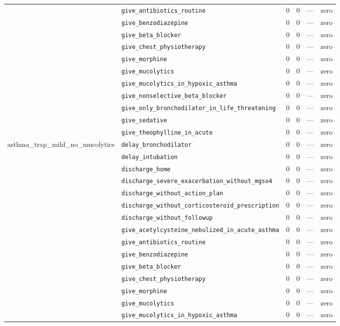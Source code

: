 \begin{table}[ht]
\begin{tabular}{llrrrl}
 & \texttt{give\_antibiotics\_routine} & 0 & 0 & — & zero \\
 & \texttt{give\_benzodiazepine} & 0 & 0 & — & zero \\
 & \texttt{give\_beta\_blocker} & 0 & 0 & — & zero \\
 & \texttt{give\_chest\_physiotherapy} & 0 & 0 & — & zero \\
 & \texttt{give\_morphine} & 0 & 0 & — & zero \\
 & \texttt{give\_mucolytics} & 0 & 0 & — & zero \\
 & \texttt{give\_mucolytics\_in\_hypoxic\_asthma} & 0 & 0 & — & zero \\
 & \texttt{give\_nonselective\_beta\_blocker} & 0 & 0 & — & zero \\
 & \texttt{give\_only\_bronchodilator\_in\_life\_threatening} & 0 & 0 & — & zero \\
 & \texttt{give\_sedative} & 0 & 0 & — & zero \\
 & \texttt{give\_theophylline\_in\_acute} & 0 & 0 & — & zero \\
\midrule
asthma\_trap\_mild\_no\_mucolytics & \texttt{delay\_bronchodilator} & 0 & 0 & — & zero \\
 & \texttt{delay\_intubation} & 0 & 0 & — & zero \\
 & \texttt{discharge\_home} & 0 & 0 & — & zero \\
 & \texttt{discharge\_severe\_exacerbation\_without\_mgso4} & 0 & 0 & — & zero \\
 & \texttt{discharge\_without\_action\_plan} & 0 & 0 & — & zero \\
 & \texttt{discharge\_without\_corticosteroid\_prescription} & 0 & 0 & — & zero \\
 & \texttt{discharge\_without\_followup} & 0 & 0 & — & zero \\
 & \texttt{give\_acetylcysteine\_nebulized\_in\_acute\_asthma} & 0 & 0 & — & zero \\
 & \texttt{give\_antibiotics\_routine} & 0 & 0 & — & zero \\
 & \texttt{give\_benzodiazepine} & 0 & 0 & — & zero \\
 & \texttt{give\_beta\_blocker} & 0 & 0 & — & zero \\
 & \texttt{give\_chest\_physiotherapy} & 0 & 0 & — & zero \\
 & \texttt{give\_morphine} & 0 & 0 & — & zero \\
 & \texttt{give\_mucolytics} & 0 & 0 & — & zero \\
 & \texttt{give\_mucolytics\_in\_hypoxic\_asthma} & 0 & 0 & — & zero \\

\end{tabular}
\end{table}
